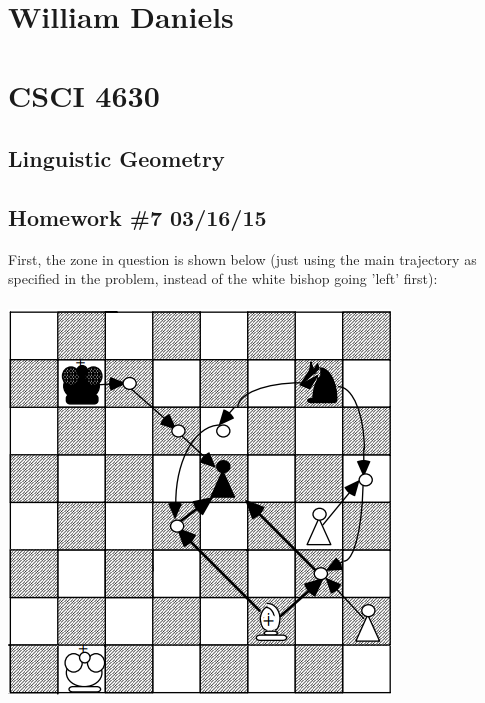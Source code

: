 \documentclass[11pt]{article}
\begin{document}
\begin{center}
\section*{William Daniels}
\section*{CSCI 4630}
\subsection*{Linguistic Geometry}
\subsection*{Homework \#7 03/16/15}
\end{center}

\vspace{.25cm}

First, the zone in question is shown below (just using the main trajectory as specified in the problem, instead of the white bishop going 'left' first): \\\\
\includegraphics{P1Zone.png}\\\\
\end{document}
